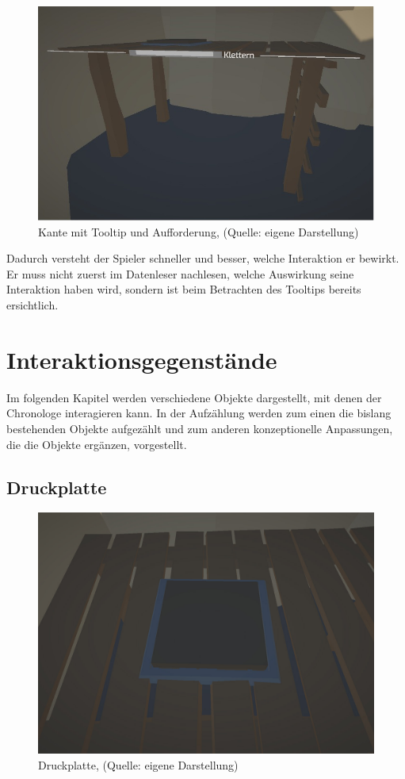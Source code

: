\begin{figure}[ht]
\centering
\includegraphics[width=0.8\linewidth]{content/pictures/leadge_tooltip_title.jpg}
\caption{Kante mit Tooltip und Aufforderung, (Quelle: eigene Darstellung)}
\label{fig:leadge_title}
\end{figure}

Dadurch versteht der Spieler schneller und besser, welche Interaktion er bewirkt. Er muss nicht zuerst im Datenleser nachlesen, welche Auswirkung seine Interaktion haben wird, sondern ist beim Betrachten des Tooltips bereits ersichtlich.

\section{Interaktionsgegenstände}
Im folgenden Kapitel werden verschiedene Objekte dargestellt, mit denen der Chronologe interagieren kann. In der Aufzählung werden zum einen die bislang bestehenden Objekte aufgezählt und zum anderen konzeptionelle Anpassungen, die die Objekte ergänzen, vorgestellt.
\subsection{Druckplatte}

\begin{figure}[ht]
\centering
\includegraphics[width=0.8\linewidth]{content/pictures/Pressureplate.jpg}
\caption{Druckplatte, (Quelle: eigene Darstellung)}
\label{fig:pressureplate_interactable}
\end{figure}

